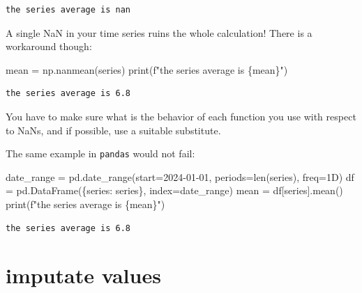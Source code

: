 \documentclass[
  letterpaper,
  DIV=11,
  numbers=noendperiod,
  oneside]{scrreprt}
\newenvironment{Shaded}{\begin{snugshade}}{\end{snugshade}}
\newcommand{\BuiltInTok}[1]{\textcolor[rgb]{0.00,0.23,0.31}{#1}}
\newcommand{\NormalTok}[1]{\textcolor[rgb]{0.00,0.23,0.31}{#1}}
\newcommand{\OperatorTok}[1]{\textcolor[rgb]{0.37,0.37,0.37}{#1}}
\newcommand{\SpecialCharTok}[1]{\textcolor[rgb]{0.37,0.37,0.37}{#1}}
\newcommand{\SpecialStringTok}[1]{\textcolor[rgb]{0.13,0.47,0.30}{#1}}
\newcommand{\StringTok}[1]{\textcolor[rgb]{0.13,0.47,0.30}{#1}}
\begin{document}
\begin{verbatim}
the series average is nan
\end{verbatim}

A single NaN in your time series ruins the whole calculation! There is a
workaround though:

\begin{Shaded}
\begin{Highlighting}[]
\NormalTok{mean }\OperatorTok{=}\NormalTok{ np.nanmean(series)}
\BuiltInTok{print}\NormalTok{(}\SpecialStringTok{f"the series average is }\SpecialCharTok{\{}\NormalTok{mean}\SpecialCharTok{\}}\SpecialStringTok{"}\NormalTok{)}
\end{Highlighting}
\end{Shaded}

\begin{verbatim}
the series average is 6.8
\end{verbatim}

You have to make sure what is the behavior of each function you use with
respect to NaNs, and if possible, use a suitable substitute.

The same example in \texttt{pandas} would not fail:

\begin{Shaded}
\begin{Highlighting}[]
\NormalTok{date\_range }\OperatorTok{=}\NormalTok{ pd.date\_range(start}\OperatorTok{=}\StringTok{\textquotesingle{}2024{-}01{-}01\textquotesingle{}}\NormalTok{, periods}\OperatorTok{=}\BuiltInTok{len}\NormalTok{(series), freq}\OperatorTok{=}\StringTok{\textquotesingle{}1D\textquotesingle{}}\NormalTok{)}
\NormalTok{df }\OperatorTok{=}\NormalTok{ pd.DataFrame(\{}\StringTok{\textquotesingle{}series\textquotesingle{}}\NormalTok{: series\}, index}\OperatorTok{=}\NormalTok{date\_range)}
\NormalTok{mean }\OperatorTok{=}\NormalTok{ df[}\StringTok{\textquotesingle{}series\textquotesingle{}}\NormalTok{].mean()}
\BuiltInTok{print}\NormalTok{(}\SpecialStringTok{f"the series average is }\SpecialCharTok{\{}\NormalTok{mean}\SpecialCharTok{\}}\SpecialStringTok{"}\NormalTok{)}
\end{Highlighting}
\end{Shaded}

\begin{verbatim}
the series average is 6.8
\end{verbatim}

\hypertarget{imputate-values}{%
\section{imputate values}\label{imputate-values}}
\end{document}
